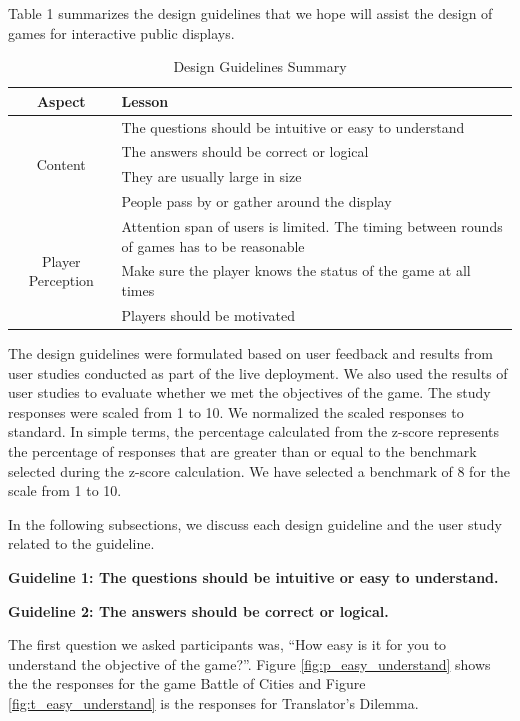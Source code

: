 \documentclass{sig-alternate}
\begin{document}
Table 1 summarizes the design guidelines that we hope will assist the design of games for interactive public displays.

\begin{table}[ht]
	\begin{tabular*}{1\textwidth}{c | l}
 		\hline
		Aspect & Lesson\\ \hline
  		\multirow{4}{*}{Content} & The questions should be intuitive or easy to understand\\
 			& The answers should be correct or logical\\
 			& They are usually large in size\\
 			& People pass by or gather around the display\\ \hline
		\multirow{4}{*}{Player Perception} & Attention span of users is limited. The timing between rounds of games has to be reasonable
\\
 			& Make sure the player knows the status of the game at all times\\
 			& Players should be motivated\\ \hline	
	\end{tabular*}
	\caption{Design Guidelines Summary}
	\label{table:design_guidlines_summary}
\end{table}

The design guidelines were formulated based on user feedback and results from user studies conducted as part of the live deployment. We also used the results of user studies to evaluate whether we met the objectives of the game. The study responses were scaled from 1 to 10. We normalized the scaled responses to standard\cite{laerd:standard_score}. In simple terms, the percentage calculated from the z-score represents the percentage of responses that are greater than or equal to the benchmark selected during the z-score calculation. We have selected a benchmark of 8 for the scale from 1 to 10.

In the following subsections, we discuss each design guideline and the user study related to the guideline.

\textbf{Guideline 1: The questions should be intuitive or easy to understand.}

\textbf{Guideline 2: The answers should be correct or logical.}

The first question we asked participants was, ``How easy is it for you to understand the objective of the game?''. 
Figure \ref{fig:p_easy_understand} shows the the responses for the game Battle of Cities and Figure \ref{fig:t_easy_understand} is the responses for Translator's Dilemma. 
\end{document}
